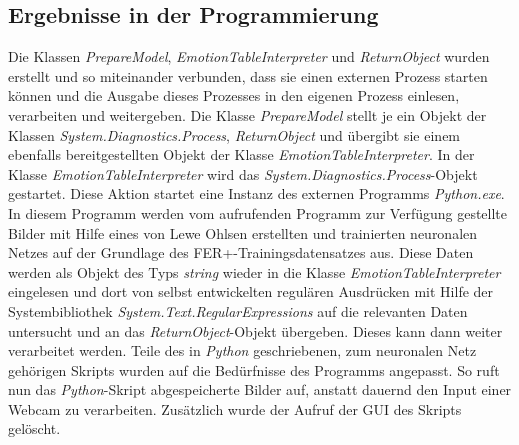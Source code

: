 \documentclass[12pt,a4paper,headinclude,twoside, plainheadsepline, open=right,numbers=noenddot]{scrreprt}
\begin{document}
\subsection{Ergebnisse in der Programmierung}
Die Klassen \textit{PrepareModel}, \textit{EmotionTableInterpreter} und \textit{ReturnObject} wurden erstellt und so miteinander verbunden, dass sie einen externen Prozess starten k\"{o}nnen und die Ausgabe dieses Prozesses in den eigenen Prozess einlesen, verarbeiten und weitergeben. Die Klasse \textit{PrepareModel} stellt je ein Objekt der Klassen \textit{System.Diagnostics.Process},  \textit{ReturnObject} und \"{u}bergibt sie einem ebenfalls bereitgestellten Objekt der Klasse  \textit{EmotionTableInterpreter}.
In der Klasse \textit{EmotionTableInterpreter} wird das \textit{System.Diagnostics.Process}-Objekt gestartet. Diese Aktion startet eine Instanz des externen Programms \textit{Python.exe}. In diesem Programm werden vom aufrufenden Programm zur Verf\"{u}gung gestellte Bilder mit Hilfe eines von Lewe Ohlsen \cite{LeweOhlsen} erstellten und trainierten neuronalen Netzes auf der Grundlage des FER+-Trainingsdatensatzes aus. Diese Daten werden als Objekt des Typs \textit{string} wieder in die Klasse \textit{EmotionTableInterpreter} eingelesen und dort von selbst entwickelten regul\"{a}ren Ausdr\"{u}cken mit Hilfe der Systembibliothek \textit{System.Text.RegularExpressions} auf die relevanten Daten untersucht und an das \textit{ReturnObject}-Objekt \"{u}bergeben. Dieses kann dann weiter verarbeitet werden. Teile des in \textit{Python} geschriebenen, zum neuronalen Netz geh\"{o}rigen Skripts wurden auf die Bed\"{u}rfnisse des Programms angepasst. So ruft nun das \textit{Python}-Skript abgespeicherte Bilder auf, anstatt dauernd den Input einer Webcam zu verarbeiten. Zus\"{a}tzlich wurde der Aufruf der GUI des Skripts gel\"{o}scht.
\end{document}
